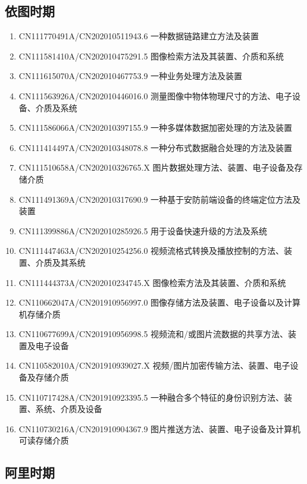 \documentclass[scheme=plain]{ctexart}
\begin{document}
\subsection*{依图时期}

\begin{enumerate}
    \item CN111770491A/CN202010511943.6 一种数据链路建立方法及装置
    \item CN111581410A/CN202010475291.5 图像检索方法及其装置、介质和系统
    \item CN111615070A/CN202010467753.9 一种业务处理方法及装置
    \item CN111563926A/CN202010446016.0 测量图像中物体物理尺寸的方法、电子设备、介质及系统
    \item CN111586066A/CN202010397155.9 一种多媒体数据加密处理的方法及装置
    \item CN111414497A/CN202010348078.8 一种分布式数据融合处理的方法及装置
    \item CN111510658A/CN202010326765.X 图片数据处理方法、装置、电子设备及存储介质
    \item CN111491369A/CN202010317690.9 一种基于安防前端设备的终端定位方法及装置
    \item CN111399886A/CN202010285926.5 用于设备快速升级的方法及系统
    \item CN111447463A/CN202010254256.0 视频流格式转换及播放控制的方法、装置、介质及其系统
    \item CN111444373A/CN202010234745.X 图像检索方法及其装置、介质和系统
    \item CN110662047A/CN201910956997.0 图像存储方法及装置、电子设备以及计算机存储介质
    \item CN110677699A/CN201910956998.5 视频流和/或图片流数据的共享方法、装置及电子设备
    \item CN110582010A/CN201910939027.X 视频/图片加密传输方法、装置、电子设备及存储介质
    \item CN110717428A/CN201910923395.5 一种融合多个特征的身份识别方法、装置、系统、介质及设备
    \item CN110730216A/CN201910904367.9 图片推送方法、装置、电子设备及计算机可读存储介质
\end{enumerate}

\subsection*{阿里时期}
\end{document}
